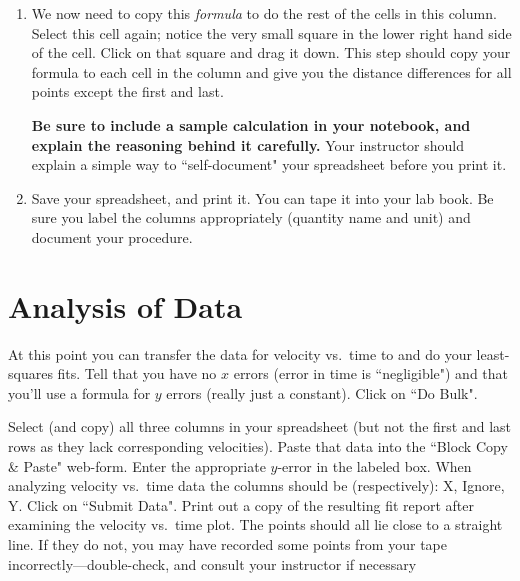 \begin{enumerate}
\begin{itemize}
\end{itemize}

\item  We now need to copy this {\em formula} to do the rest of the cells in
this column.  Select this cell again; notice the very small square
in the lower right hand side of the cell.  Click on that square
and drag it down.   This step should copy your formula to each cell
in the column and give
you the distance differences for all points except the first and last.


{\bf Be sure to include a sample calculation in your notebook, and
explain the reasoning behind it carefully.}  Your instructor should explain
a simple way to ``self-document" your spreadsheet before you print it.

\item  Save your spreadsheet, and print it.  You can tape it into
your lab book.  Be sure you label the columns appropriately 
(quantity name and unit) and 
document your procedure.

\end{enumerate}

\section*{Analysis of Data}

At this point you can transfer the data for velocity vs.\ time to \WAPP  and do your least-squares
fits.  Tell \WAPP that you have no $x$ errors (error in
time is ``negligible") and that you'll use a formula for $y$ errors
(really just a constant).  Click on ``Do Bulk".

Select (and copy) all three columns in your spreadsheet
(but not the first and last rows as  they lack corresponding velocities).
Paste that
data into the ``Block Copy \& Paste" web-form.  Enter the appropriate
$y$-error in the labeled box.  
When analyzing velocity vs.\ time
data the columns should be (respectively): X, Ignore, Y.
Click on ``Submit Data". Print out a copy of the resulting fit report after
examining the velocity vs.\ time plot.
The points should all lie
close to a straight line.  If they do not, you may have recorded some points from your
tape incorrectly---double-check, and consult your instructor if necessary


